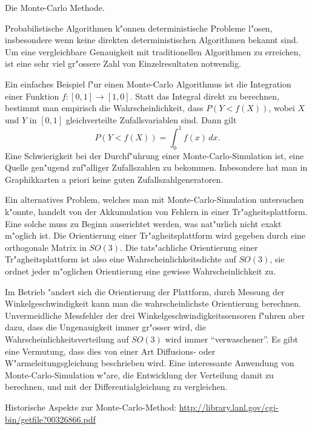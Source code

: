 \begin{aufgabe}
Die Monte-Carlo Methode.
\end{aufgabe}

Probabilistische Algorithmen k"onnen deterministische Probleme l"osen,
insbesondere wenn keine direkten deterministischen Algorithmen bekannt 
sind.
Um eine vergleichbare Genauigkeit mit traditionellen Algorithmen zu
erreichen, ist eine sehr viel gr"ossere Zahl von Einzelresultaten notwendig.

Ein einfaches Beispiel f"ur einen Monte-Carlo Algorithmus ist die Integration
einer Funktion $f\colon[0,1]\to[1,0]$.
Statt das Integral direkt zu berechnen,
bestimmt man empirisch die Wahrscheinlichkeit, dass $P(Y < f(X))$, wobei
$X$ und $Y$ in $[0,1]$ gleichverteilte Zufallsvariablen sind. Dann gilt
\[
P(Y<f(X)) = \int_0^1f(x)\,dx.
\]
Eine Schwierigkeit bei der Durchf"uhrung einer Monte-Carlo-Simulation
ist, eine Quelle gen"ugend zuf"alliger Zufallszahlen zu bekommen.
Inbesondere hat man in Graphikkarten a priori keine guten
Zufallszahlgeneratoren. 

Ein alternatives Problem, welches man mit Monte-Carlo-Simulation untersuchen
k"onnte, handelt von der Akkumulation von Fehlern in einer Tr"agheitsplattform.
Eine solche muss zu Beginn auserichtet werden, was nat"urlich nicht
exakt m"oglich ist. Die Orientierung einer Tr"agheitsplattform wird gegeben
durch eine orthogonale Matrix in $SO(3)$. 
Die tats"achliche Orientierung einer Tr"agheitsplattform ist also eine
Wahrscheinlichkeitsdichte auf $SO(3)$, sie ordnet jeder m"oglichen
Orientierung eine gewisse Wahrscheinlichkeit zu.

Im Betrieb "andert sich die Orientierung der Plattform, durch Messung
der Winkelgeschwindigkeit kann man die wahrscheinlichste Orientierung
berechnen.
Unvermeidliche Messfehler der drei Winkelgeschwindigkeitssensoren
f"uhren aber dazu, dass die Ungenauigkeit immer gr"osser wird, die
Wahrscheinlichkeitsverteilung auf $SO(3)$ wird immer ``verwaschener''.
Es gibt eine Vermutung, dass dies von einer Art Diffusions- oder
W"armeleitungsgleichung beschrieben wird.
Eine interessante Anwendung von Monte-Carlo-Simulation w"are, die
Entwicklung der Verteilung damit zu berechnen, und mit der 
Differentialgleichung zu vergleichen.

Historische Aspekte zur Monte-Carlo-Method:
\url{http://library.lanl.gov/cgi-bin/getfile?00326866.pdf}
